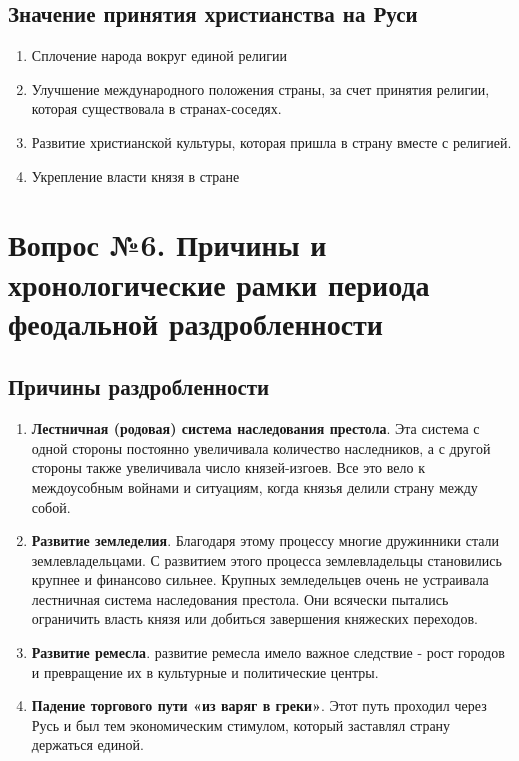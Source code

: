 \documentclass{article}
\begin{document}
\subsection{Значение принятия христианства на Руси}

\begin{enumerate}
    \item Сплочение народа вокруг единой религии
    \item Улучшение международного положения страны, за счет принятия религии, которая существовала в странах-соседях.
    \item Развитие христианской культуры, которая пришла в страну вместе с религией.
    \item Укрепление власти князя в стране
\end{enumerate}

\pagebreak
\section{Вопрос №6. Причины и хронологические рамки периода феодальной раздробленности}

\subsection{Причины раздробленности}

\begin{enumerate}
    \item \textbf{Лестничная (родовая) система наследования престола}. Эта система с одной стороны постоянно увеличивала количество наследников, а с другой стороны также увеличивала число князей-изгоев. Все это вело к междоусобным войнами и ситуациям, когда князья делили страну между собой.
    \item \textbf{Развитие земледелия}. Благодаря этому процессу многие дружинники стали землевладельцами. С развитием этого процесса землевладельцы становились крупнее и финансово сильнее. Крупных земледельцев очень не устраивала лестничная система наследования престола. Они всячески пытались ограничить власть князя или добиться завершения княжеских переходов.
    \item \textbf{Развитие ремесла}. развитие ремесла имело важное следствие - рост городов и превращение их в культурные и политические центры.
    \item \textbf{Падение торгового пути «из варяг в греки»}. Этот путь проходил через Русь и был тем экономическим стимулом, который заставлял страну держаться единой.
\end{enumerate}
\end{document}
